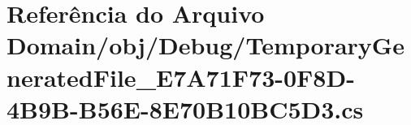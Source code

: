 \hypertarget{Domain_2obj_2Debug_2TemporaryGeneratedFile__E7A71F73-0F8D-4B9B-B56E-8E70B10BC5D3_8cs}{}\section{Referência do Arquivo Domain/obj/\+Debug/\+Temporary\+Generated\+File\+\_\+\+E7\+A71\+F73-\/0\+F8\+D-\/4\+B9\+B-\/\+B56\+E-\/8\+E70\+B10\+B\+C5\+D3.cs}
\label{Domain_2obj_2Debug_2TemporaryGeneratedFile__E7A71F73-0F8D-4B9B-B56E-8E70B10BC5D3_8cs}
